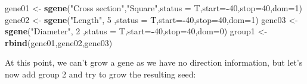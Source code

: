 \documentclass[]{article}
\newenvironment{Shaded}{\begin{snugshade}}{\end{snugshade}}
\newcommand{\DataTypeTok}[1]{\textcolor[rgb]{0.13,0.29,0.53}{#1}}
\newcommand{\DecValTok}[1]{\textcolor[rgb]{0.00,0.00,0.81}{#1}}
\newcommand{\KeywordTok}[1]{\textcolor[rgb]{0.13,0.29,0.53}{\textbf{#1}}}
\newcommand{\NormalTok}[1]{#1}
\newcommand{\OperatorTok}[1]{\textcolor[rgb]{0.81,0.36,0.00}{\textbf{#1}}}
\newcommand{\StringTok}[1]{\textcolor[rgb]{0.31,0.60,0.02}{#1}}
\begin{document}
\begin{Shaded}
\begin{Highlighting}[]
\NormalTok{gene01 <-}\StringTok{ }\KeywordTok{sgene}\NormalTok{(}\StringTok{"Cross section"}\NormalTok{,}\StringTok{"Square"}\NormalTok{,}\DataTypeTok{status =}\NormalTok{ T,}\DataTypeTok{start=}\OperatorTok{-}\DecValTok{40}\NormalTok{,}\DataTypeTok{stop=}\DecValTok{40}\NormalTok{,}\DataTypeTok{dom=}\DecValTok{1}\NormalTok{)}
\NormalTok{gene02 <-}\StringTok{ }\KeywordTok{sgene}\NormalTok{(}\StringTok{"Length"}\NormalTok{,       }\DecValTok{5}\NormalTok{       ,}\DataTypeTok{status =}\NormalTok{ T,}\DataTypeTok{start=}\OperatorTok{-}\DecValTok{40}\NormalTok{,}\DataTypeTok{stop=}\DecValTok{40}\NormalTok{,}\DataTypeTok{dom=}\DecValTok{1}\NormalTok{)}
\NormalTok{gene03 <-}\StringTok{ }\KeywordTok{sgene}\NormalTok{(}\StringTok{"Diameter"}\NormalTok{,     }\DecValTok{2}\NormalTok{       ,}\DataTypeTok{status =}\NormalTok{ T,}\DataTypeTok{start=}\OperatorTok{-}\DecValTok{40}\NormalTok{,}\DataTypeTok{stop=}\DecValTok{40}\NormalTok{,}\DataTypeTok{dom=}\DecValTok{0}\NormalTok{)}
\NormalTok{group1 <-}\StringTok{ }\KeywordTok{rbind}\NormalTok{(gene01,gene02,gene03)}
\end{Highlighting}
\end{Shaded}

At this point, we can't grow a gene as we have no direction information,
but let's now add group 2 and try to grow the resulting seed:
\end{document}
